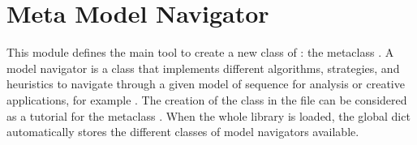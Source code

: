 \documentclass[letterpaper,10pt,english]{sphinxmanual}
\begin{document}
\label{\detokenize{index:module-MetaModelNavigator}}

\section{Meta Model Navigator}
\label{\detokenize{index:meta-model-navigator}}
This module defines the main tool to create a new class of : the metaclass {\hyperref[\detokenize{index:MetaModelNavigator.MetaModelNavigator}]{}}.
A model navigator is a class that implements different algorithms, strategies, and heuristics to navigate through a given model of sequence for analysis or creative applications, for example . 
The creation of the class {\hyperref[\detokenize{index:ModelNavigator.FactorOracleNavigator}]{}} in the file  can be considered as a tutorial for the metaclass {\hyperref[\detokenize{index:MetaModelNavigator.MetaModelNavigator}]{}}.
When the whole library is loaded, the global dict  automatically stores the different classes of model navigators available.
\end{document}

